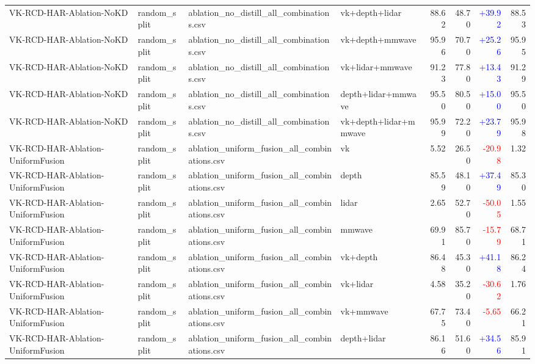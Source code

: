 \documentclass[10pt]{article}
\begin{document}
\begin{longtable}{llllrrrr}
VK-RCD-HAR-Ablation-NoKD & random\_split & ablation\_no\_distill\_all\_combinations.csv & vk+depth+lidar & 88.62 & 48.70 & \textcolor{blue}{+39.92} & 88.53\\
VK-RCD-HAR-Ablation-NoKD & random\_split & ablation\_no\_distill\_all\_combinations.csv & vk+depth+mmwave & 95.96 & 70.70 & \textcolor{blue}{+25.26} & 95.95\\
VK-RCD-HAR-Ablation-NoKD & random\_split & ablation\_no\_distill\_all\_combinations.csv & vk+lidar+mmwave & 91.23 & 77.80 & \textcolor{blue}{+13.43} & 91.29\\
VK-RCD-HAR-Ablation-NoKD & random\_split & ablation\_no\_distill\_all\_combinations.csv & depth+lidar+mmwave & 95.50 & 80.50 & \textcolor{blue}{+15.00} & 95.50\\
VK-RCD-HAR-Ablation-NoKD & random\_split & ablation\_no\_distill\_all\_combinations.csv & vk+depth+lidar+mmwave & 95.99 & 72.20 & \textcolor{blue}{+23.79} & 95.98\\
VK-RCD-HAR-Ablation-UniformFusion & random\_split & ablation\_uniform\_fusion\_all\_combinations.csv & vk & 5.52 & 26.50 & \textcolor{red}{-20.98} & 1.32\\
VK-RCD-HAR-Ablation-UniformFusion & random\_split & ablation\_uniform\_fusion\_all\_combinations.csv & depth & 85.59 & 48.10 & \textcolor{blue}{+37.49} & 85.30\\
VK-RCD-HAR-Ablation-UniformFusion & random\_split & ablation\_uniform\_fusion\_all\_combinations.csv & lidar & 2.65 & 52.70 & \textcolor{red}{-50.05} & 1.55\\
VK-RCD-HAR-Ablation-UniformFusion & random\_split & ablation\_uniform\_fusion\_all\_combinations.csv & mmwave & 69.91 & 85.70 & \textcolor{red}{-15.79} & 68.71\\
VK-RCD-HAR-Ablation-UniformFusion & random\_split & ablation\_uniform\_fusion\_all\_combinations.csv & vk+depth & 86.48 & 45.30 & \textcolor{blue}{+41.18} & 86.24\\
VK-RCD-HAR-Ablation-UniformFusion & random\_split & ablation\_uniform\_fusion\_all\_combinations.csv & vk+lidar & 4.58 & 35.20 & \textcolor{red}{-30.62} & 1.76\\
VK-RCD-HAR-Ablation-UniformFusion & random\_split & ablation\_uniform\_fusion\_all\_combinations.csv & vk+mmwave & 67.75 & 73.40 & \textcolor{red}{-5.65} & 66.21\\
VK-RCD-HAR-Ablation-UniformFusion & random\_split & ablation\_uniform\_fusion\_all\_combinations.csv & depth+lidar & 86.16 & 51.60 & \textcolor{blue}{+34.56} & 85.91\\

\end{longtable}
\end{document}
